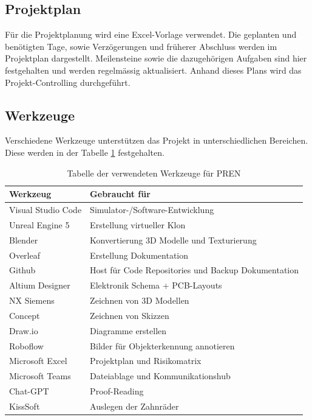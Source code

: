 \documentclass[../main.tex]{subfiles}
\begin{document}
\subsection{Projektplan}
Für die Projektplanung wird eine Excel-Vorlage verwendet. Die geplanten und benötigten Tage, sowie Verzögerungen und früherer Abschluss werden im Projektplan dargestellt. Meilensteine sowie die dazugehörigen Aufgaben sind hier festgehalten und werden regelmässig aktualisiert. Anhand dieses Plans wird das Projekt-Controlling durchgeführt.


\subsection{Werkzeuge}

Verschiedene Werkzeuge unterstützen das Projekt in unterschiedlichen Bereichen. Diese werden in der Tabelle \ref{tab:werkzeugtabelle} festgehalten.

\begin{table}[H]
\centering
\begin{tabular}{|l|l|}
\hline
\textbf{Werkzeug} & \textbf{Gebraucht für} \\ \hline
Visual Studio Code & Simulator-/Software-Entwicklung \\ \hline
Unreal Engine 5 & Erstellung virtueller Klon \\ \hline
Blender & Konvertierung 3D Modelle und Texturierung \\ \hline
Overleaf & Erstellung Dokumentation \\ \hline
Github & Host für Code Repositories und Backup Dokumentation \\ \hline
Altium Designer & Elektronik Schema + PCB-Layouts \\ \hline
NX Siemens & Zeichnen von 3D Modellen \\ \hline
Concept & Zeichnen von Skizzen \\ \hline
Draw.io & Diagramme erstellen \\ \hline
Roboflow & Bilder für Objekterkennung annotieren \\ \hline
Microsoft Excel & Projektplan und Risikomatrix \\ \hline
Microsoft Teams & Dateiablage und Kommunikationshub \\ \hline
Chat-GPT & Proof-Reading \\ \hline
KissSoft & Auslegen der Zahnräder \\ \hline
 
\end{tabular}
\caption{Tabelle der verwendeten Werkzeuge für PREN}
\label{tab:werkzeugtabelle}
\end{table}
\end{document}
